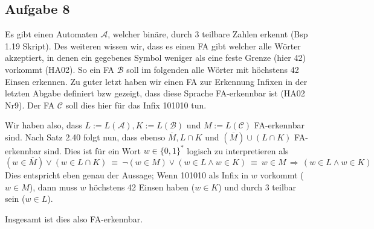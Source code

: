 \documentclass[a4paper,graphics,11pt]{article}
\newcommand{\aufgabe}[1]{\subsection*{Aufgabe #1}}
\begin{document}

\newpage
\aufgabe{8}
Es gibt einen Automaten $\mathcal{A}$, welcher binäre, durch 3 teilbare Zahlen erkennt (Bsp 1.19 Skript).
Des weiteren wissen wir, dass es einen FA gibt welcher alle Wörter akzeptiert,
in denen ein gegebenes Symbol weniger als eine feste Grenze (hier 42) vorkommt (HA02). So ein FA $\mathcal{B}$
soll im folgenden alle Wörter mit höchstens 42 Einsen erkennen.
Zu guter letzt haben wir einen FA zur Erkennung Infixen in der letzten Abgabe definiert bzw gezeigt, dass diese Sprache FA-erkennbar ist (HA02 Nr9). Der FA $\mathcal{C}$ soll dies hier für das Infix 101010 tun.

Wir haben also, dass $L := L(\mathcal{A}), K := L(\mathcal{B})$ und $M := L(\mathcal{C})$ FA-erkennbar sind.
Nach Satz 2.40 folgt nun, dass ebenso $\overline{M}, L \cap K$ und $(\overline{M}) \cup (L \cap K)$ FA-erkennbar
sind.
Dies ist für ein Wort $w \in \{0, 1\}^*$ logisch zu interpretieren als
$$
    (w \in \overline{M}) \lor (w \in L \cap K)\
    \equiv\ \lnot (w \in M) \lor (w \in L \land w \in K)\
    \equiv\ w \in M \,\Longrightarrow\, (w \in L \land w \in K)
$$
Dies entspricht eben genau der Aussage; Wenn 101010 als Infix in $w$ vorkommt ($w \in M$), dann muss 
$w$ höchstens 42 Einsen haben ($w \in K$) und durch 3 teilbar sein ($w \in L$).

Insgesamt ist dies also FA-erkennbar.
\end{document}
